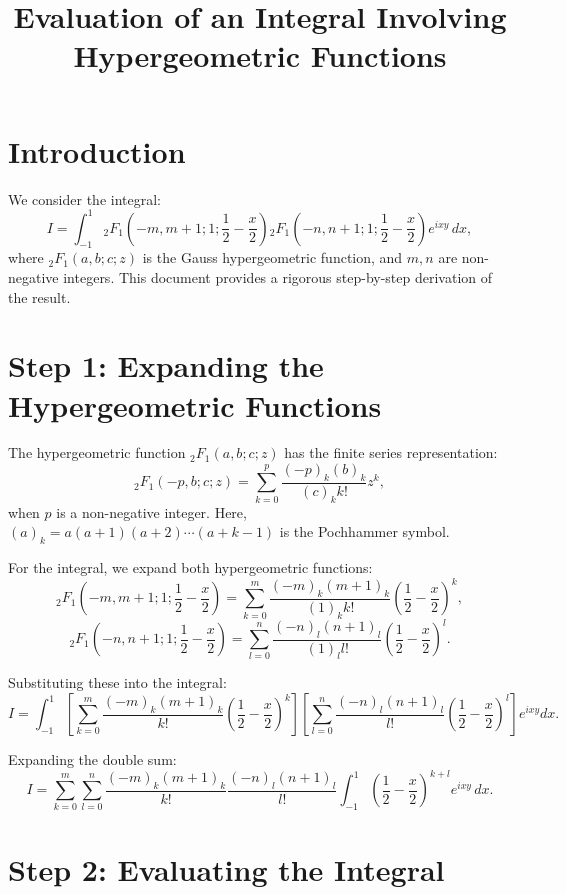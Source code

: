 \documentclass[12pt]{article}
\begin{document}
\title{Evaluation of an Integral Involving Hypergeometric Functions}
\author{}
\date{}
\maketitle

\section*{Introduction}

We consider the integral:
\[
I = \int_{-1}^1 {}_2F_1\left(-m, m+1; 1; \frac{1}{2} - \frac{x}{2}\right) 
{}_2F_1\left(-n, n+1; 1; \frac{1}{2} - \frac{x}{2}\right) e^{i x y} \, dx,
\]
where ${}_2F_1(a, b; c; z)$ is the Gauss hypergeometric function, and $m, n$ are non-negative integers. This document provides a rigorous step-by-step derivation of the result.

\section*{Step 1: Expanding the Hypergeometric Functions}

The hypergeometric function ${}_2F_1(a, b; c; z)$ has the finite series representation:
\[
{}_2F_1(-p, b; c; z) = \sum_{k=0}^p \frac{(-p)_k (b)_k}{(c)_k k!} z^k,
\]
when $p$ is a non-negative integer. Here, $(a)_k = a(a+1)(a+2)\cdots(a+k-1)$ is the Pochhammer symbol.

For the integral, we expand both hypergeometric functions:
\[
{}_2F_1\left(-m, m+1; 1; \frac{1}{2} - \frac{x}{2}\right) = 
\sum_{k=0}^m \frac{(-m)_k (m+1)_k}{(1)_k k!} \left(\frac{1}{2} - \frac{x}{2}\right)^k,
\]
\[
{}_2F_1\left(-n, n+1; 1; \frac{1}{2} - \frac{x}{2}\right) = 
\sum_{l=0}^n \frac{(-n)_l (n+1)_l}{(1)_l l!} \left(\frac{1}{2} - \frac{x}{2}\right)^l.
\]

Substituting these into the integral:
\[
I = \int_{-1}^1 \left[ \sum_{k=0}^m \frac{(-m)_k (m+1)_k}{k!} \left(\frac{1}{2} - \frac{x}{2}\right)^k \right]
\left[ \sum_{l=0}^n \frac{(-n)_l (n+1)_l}{l!} \left(\frac{1}{2} - \frac{x}{2}\right)^l \right] e^{i x y} dx.
\]

Expanding the double sum:
\[
I = \sum_{k=0}^m \sum_{l=0}^n \frac{(-m)_k (m+1)_k}{k!} \frac{(-n)_l (n+1)_l}{l!} 
\int_{-1}^1 \left(\frac{1}{2} - \frac{x}{2}\right)^{k+l} e^{i x y} \, dx.
\]

\section*{Step 2: Evaluating the Integral}
\end{document}
